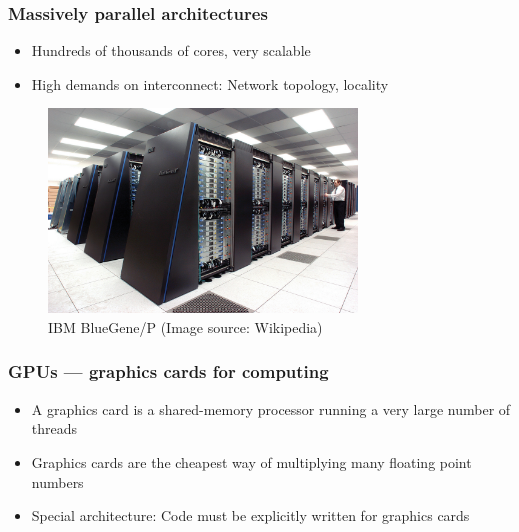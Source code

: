 \documentclass[usenames,dvipsnames,mathserif,compress]{beamer}
\begin{document}
\begin{frame}
  \frametitle{Massively parallel architectures}
  \begin{itemize}
  \item Hundreds of thousands of cores, very scalable
  \item High demands on interconnect: Network topology, locality
  \end{itemize}
  \begin{figure}
    \includegraphics[width=0.73\textwidth]{IBM_Blue_Gene_P_supercomputer.jpg}
    \caption{IBM BlueGene/P (Image source: Wikipedia)}
  \end{figure}
\end{frame}


\begin{frame}
  \frametitle{GPUs --- graphics cards for computing}
  \begin{itemize}
  \item A graphics card is a shared-memory processor running a very large number of threads
  \item Graphics cards are the cheapest way of multiplying many floating point numbers
  \item Special architecture: Code must be explicitly written for graphics cards
    \end{itemize}
\end{frame}
\end{document}

